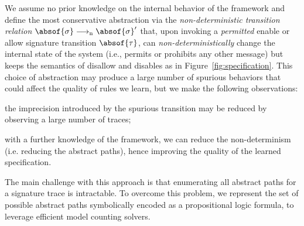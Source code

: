 We assume no prior knowledge on the internal behavior of the
framework and define the most conservative abstraction via the \emph{non-deterministic 
transition relation} $\jstep[\nondet]{ \absof{\state} }{ \absof{\state}' }$ that, upon
invoking a \emph{permitted} enable or allow signature transition $\absof{\trans}$, can
\emph{non-deterministically} change the internal state of the system 
(i.e., permits or prohibits any other message) 
but keeps the semantics of disallow and disables as in Figure~\ref{fig:specification}.  
This choice of abstraction may produce a large number
of spurious behaviors that could affect
the quality of rules we learn, but we make the following observations:
\begin{inparaenum}[(i)]%
\item the imprecision introduced by the spurious transition
may be reduced by observing a large number of traces;
\item with a further knowledge of the framework, we can
reduce the non-determinism (i.e. reducing the abstract paths),
hence improving the quality of the learned specification.
\end{inparaenum}
%
%

The main challenge with this approach is that enumerating all abstract 
paths for a signature trace is intractable. To overcome this problem, 
we represent the set of possible abstract paths symbolically
encoded as a propositional logic formula, to leverage 
efficient model counting solvers.

